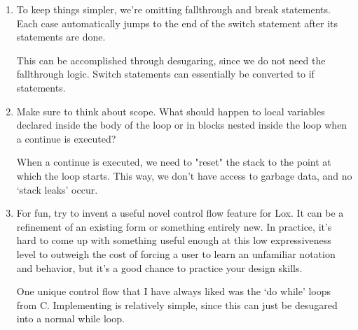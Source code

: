 \documentclass{article}
\begin{document}
\begin{enumerate}
    \item {
        To keep things simpler, we’re omitting fallthrough and break statements. Each case
        automatically jumps to the end of the switch statement after its statements are done.

        This can be accomplished through desugaring, since we do not need the 
        fallthrough logic. Switch statements can essentially be converted to 
        if statements.
    }

    \item {
        Make sure to think about scope. What should happen to local variables declared inside the
        body of the loop or in blocks nested inside the loop when a continue is executed?

        When a continue is executed, we need to "reset" the stack to the point 
        at which the loop starts. This way, we don't have access to garbage data,
        and no `stack leaks' occur.
    }

    \item {
        For fun, try to invent a useful novel control flow feature for Lox. It can be a refinement of an
        existing form or something entirely new. In practice, it’s hard to come up with something
        useful enough at this low expressiveness level to outweigh the cost of forcing a user to
        learn an unfamiliar notation and behavior, but it’s a good chance to practice your design
        skills.

        One unique control flow that I have always liked was the `do while' loops 
        from C. Implementing is relatively simple, since this can just be desugared 
        into a normal while loop. 
    }
\end{enumerate}
\end{document}
